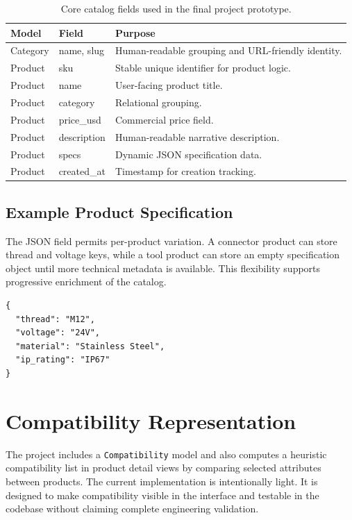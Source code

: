 \documentclass[12pt,letterpaper,oneside,openany]{book}
\begin{document}
\begin{table}[H]
\centering
\begin{tabular}{|p{1.8in}|p{1.6in}|p{2.6in}|}
\hline
\textbf{Model} & \textbf{Field} & \textbf{Purpose} \\ \hline
Category & name, slug & Human-readable grouping and URL-friendly identity. \\ \hline
Product & sku & Stable unique identifier for product logic. \\ \hline
Product & name & User-facing product title. \\ \hline
Product & category & Relational grouping. \\ \hline
Product & price\_usd & Commercial price field. \\ \hline
Product & description & Human-readable narrative description. \\ \hline
Product & specs & Dynamic JSON specification data. \\ \hline
Product & created\_at & Timestamp for creation tracking. \\ \hline
\end{tabular}
\caption{Core catalog fields used in the final project prototype.}
\label{tab:catalog_fields}
\end{table}

\subsection{Example Product Specification}

\begin{justifying}
The JSON field permits per-product variation. A connector product can store
thread and voltage keys, while a tool product can store an empty specification
object until more technical metadata is available. This flexibility supports
progressive enrichment of the catalog.
\end{justifying}

\begin{lstlisting}[caption={Representative JSON-style product specifications},label={lst:jsonspec}]
{
  "thread": "M12",
  "voltage": "24V",
  "material": "Stainless Steel",
  "ip_rating": "IP67"
}
\end{lstlisting}

\section{Compatibility Representation}

\begin{justifying}
The project includes a \texttt{Compatibility} model and also computes a
heuristic compatibility list in product detail views by comparing selected
attributes between products. The current implementation is intentionally light.
It is designed to make compatibility visible in the interface and testable in
the codebase without claiming complete engineering validation.
\end{justifying}
\end{document}
